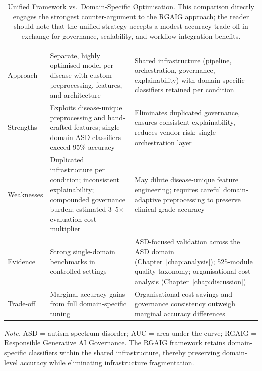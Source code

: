 {\tablestripes\tablefontsize
\begin{xltabular}{\textwidth}{@{} >{\raggedright\arraybackslash}p{0.14\textwidth} >{\raggedright\arraybackslash}X >{\raggedright\arraybackslash}X @{}}
\caption[Unified Framework vs.Domain-Specific Optimisation]{Unified Framework vs.\ Domain-Specific Optimisation. This comparison directly engages the strongest counter-argument to the RGAIG approach; the reader should note that the unified strategy accepts a modest accuracy trade-off in exchange for governance, scalability, and workflow integration benefits.}\label{tab:unified_vs_domainspecific} \\
\toprule
{} &  &  \\
\midrule
\endfirsthead
\toprule
{} &  &  \\
\midrule
\endhead
\bottomrule
\endlastfoot
Approach & Separate, highly optimised model per disease with custom preprocessing, features, and architecture & Shared infrastructure (pipeline, orchestration, governance, explainability) with domain-specific classifiers retained per condition \\
\addlinespace
Strengths & Exploits disease-unique preprocessing and hand-crafted features; single-domain ASD classifiers exceed 95\% accuracy~\cite{bosl2018eeg} & Eliminates duplicated governance, ensures consistent explainability, reduces vendor risk; single orchestration layer \\
\addlinespace
Weaknesses & Duplicated infrastructure per condition; inconsistent explainability; compounded governance burden; estimated 3--5$\times$ evaluation cost multiplier & May dilute disease-unique feature engineering; requires careful domain-adaptive preprocessing to preserve clinical-grade accuracy \\
\addlinespace
Evidence & Strong single-domain benchmarks in controlled settings & ASD-focused validation across the ASD domain (Chapter~\ref{chap:analysis}); 525-module quality taxonomy; organisational cost analysis (Chapter~\ref{chap:discussion}) \\
\addlinespace
Trade-off & Marginal accuracy gains from full domain-specific tuning & Organisational cost savings and governance consistency outweigh marginal accuracy differences \\
\end{xltabular}}
\vspace{0.5em}
\noindent\textit{Note.} ASD = autism spectrum disorder;  AUC = area under the curve; RGAIG = Responsible Generative AI Governance. The RGAIG framework retains domain-specific classifiers within the shared infrastructure, thereby preserving domain-level accuracy while eliminating infrastructure fragmentation.

